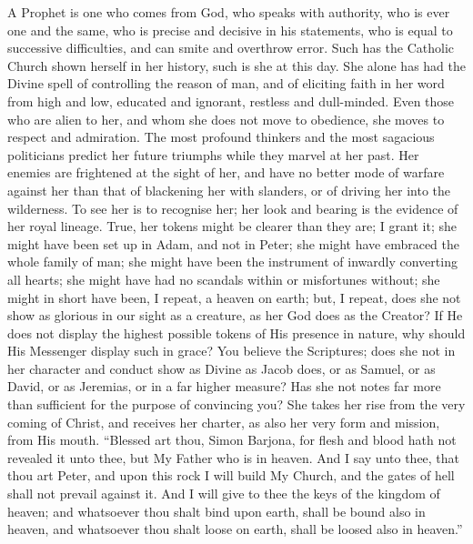 A Prophet is one who comes from God, who speaks with authority, who
is ever one and the same, who is precise and decisive in his
statements, who is equal to successive difficulties, and can smite and
overthrow error. Such has the Catholic Church shown herself in her
history, such is she at this day. She alone has had the Divine spell
of controlling the reason of man, and of eliciting faith in her word
from high and low, educated and ignorant, restless and dull-minded.
Even those who are alien to her, and whom she does not move to
obedience, she moves to respect and admiration. The most profound
thinkers and the most sagacious politicians predict her future
triumphs while they marvel at her past. Her enemies are frightened at
the sight of her, and have no better mode of warfare against her than
that of blackening her with slanders, or of driving her into the
wilderness. To see her is to recognise her; her look and bearing is
the evidence of her royal lineage. True, her tokens might be clearer
than they are; I grant it; she might have been set up in Adam, and not
in Peter; she might have embraced the whole family of man; she might
have been the instrument of inwardly converting all hearts; she might
have had no scandals within or misfortunes without; she might in short
have been, I repeat, a heaven on earth; but, I repeat, does she not
show as glorious in our sight as a creature, as her God does as the
Creator? If He does not display the highest possible tokens of His
presence in nature, why should His Messenger display such in grace?
You believe the Scriptures; does she not in her character and conduct
show as Divine as Jacob does, or as Samuel, or as David, or as
Jeremias, or in a far higher measure? Has she not notes far more than
sufficient for the purpose of convincing you? She takes her rise from
the very coming of Christ, and receives her charter, as also her very
form and mission, from His mouth. ``Blessed art thou, Simon
Barjona, for flesh and blood hath not revealed it unto thee, but My
Father who is in heaven. And I say unto thee, that thou art Peter, and
upon this rock I will build My Church, and the gates of hell shall not
prevail against it. And I will give to thee the keys of the kingdom of
heaven; and whatsoever thou shalt bind upon earth, shall be bound also
in heaven, and whatsoever thou shalt loose on earth, shall be loosed
also in heaven.''

